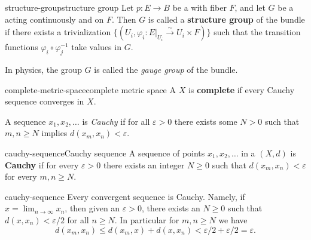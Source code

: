 \begin{topic}{structure-group}{structure group}
    Let $p : E \to B$ be a  with fiber $F$, and let $G$ be a  acting continuously and  on $F$. Then $G$ is called a \textbf{structure group} of the bundle if there exists a trivialization $\{ (U_i, \varphi_i : E|_{U_i} \xrightarrow{\sim} U_i \times F) \}$ such that the transition functions $\varphi_i \circ \varphi_j^{-1}$ take values in $G$. 
    
    In physics, the group $G$ is called the \textit{gauge group} of the bundle.
\end{topic}


\begin{topic}{complete-metric-space}{complete metric space}
    A  $X$ is \textbf{complete} if every Cauchy sequence converges in $X$.
    
    A sequence $x_1, x_2, \ldots$ is \textit{Cauchy} if for all $\varepsilon > 0$ there exists some $N > 0$ such that $m, n \ge N$ implies $d(x_m, x_n) < \varepsilon$.
\end{topic}

\begin{topic}{cauchy-sequence}{Cauchy sequence}
    A sequence of points $x_1, x_2, \ldots$ in a  $(X, d)$ is \textbf{Cauchy} if for every $\varepsilon > 0$ there exists an integer $N \ge 0$ such that $d(x_m, x_n) < \varepsilon$ for every $m, n \ge N$.
\end{topic}

\begin{example}{cauchy-sequence}
    Every convergent sequence is Cauchy. Namely, if $x = \lim_{n \to \infty} x_n$, then given an $\varepsilon > 0$, there exists an $N \ge 0$ such that $d(x, x_n) < \varepsilon / 2$ for all $n \ge N$. In particular for $m, n \ge N$ we have
    \[ d(x_m, x_n) \le d(x_m, x) + d(x, x_n) < \varepsilon/2 + \varepsilon/2 = \varepsilon . \]
\end{example}

